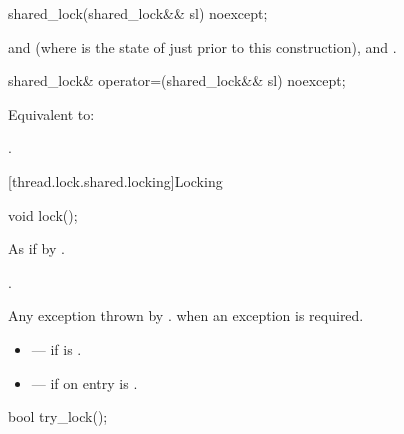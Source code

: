%
\begin{itemdecl}
shared_lock(shared_lock&& sl) noexcept;
\end{itemdecl}

\begin{itemdescr}
\pnum
\ensures
{} and  (where
 is the state of  just prior to this construction),
 and .
\end{itemdescr}

%
\begin{itemdecl}
shared_lock& operator=(shared_lock&& sl) noexcept;
\end{itemdecl}

\begin{itemdescr}
\pnum
\effects
Equivalent to: 

\pnum
\returns
{}.
\end{itemdescr}

[thread.lock.shared.locking]{Locking}

%
\begin{itemdecl}
void lock();
\end{itemdecl}

\begin{itemdescr}
\pnum
\effects
As if by .

\pnum
\ensures
{}.

\pnum
\throws
Any exception thrown by .
 when an exception is required.

\pnum
\errors
\begin{itemize}
\item {} --- if  is .
\item {} --- if on entry  is
.
\end{itemize}
\end{itemdescr}

%
\begin{itemdecl}
bool try_lock();
\end{itemdecl}

